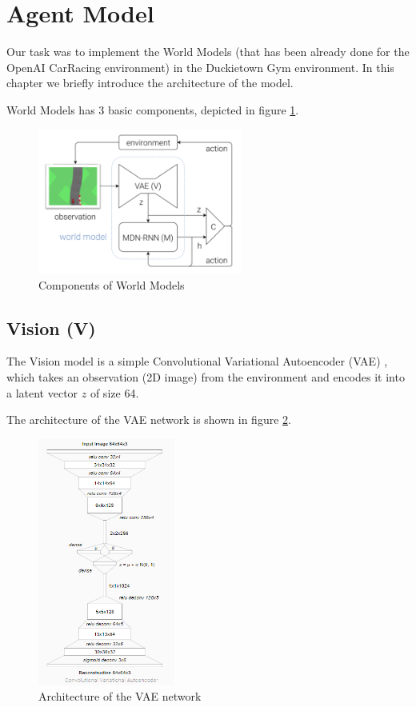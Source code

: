 \documentclass{article}
\begin{document}
\section{Agent Model}

Our task was to implement the World Models\cite{worldmodels} (that has been already done for the OpenAI CarRacing environment) in the Duckietown Gym environment. In this chapter we briefly introduce the architecture of the model.

World Models has 3 basic components, depicted in figure \ref{fig:model}.

\begin{figure}
    \centering
    \includegraphics[width=0.6\textwidth]{world_models.png}
    \caption{Components of World Models}
    \label{fig:model}
\end{figure}

\subsection{Vision (V)}

 The Vision model is a simple Convolutional Variational Autoencoder (VAE) \cite{vae1}, \cite{vae2} which takes an observation (2D image) from the environment and encodes it into a latent vector $z$ of size 64.

The architecture of the VAE network is shown in figure \ref{fig:vae}.

\begin{figure}
    \centering
    \includegraphics[width=0.4\textwidth]{VAE.png}
    \caption{Architecture of the VAE network}
    \label{fig:vae}
\end{figure}
\end{document}
